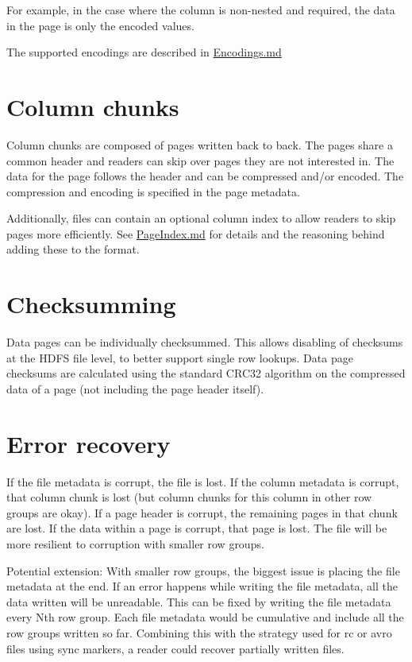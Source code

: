\documentclass[a4paper,12pt,notitlepage,twoside,openright]{article}
\begin{document}
For example, in the case where the column is non-nested and required,
the data in the page is only the encoded values.

The supported encodings are described in
\href{https://github.com/apache/parquet-format/blob/master/Encodings.md}{Encodings.md}

\hypertarget{column-chunks}{%
\section{Column chunks}\label{column-chunks}}

Column chunks are composed of pages written back to back. The pages
share a common header and readers can skip over pages they are not
interested in. The data for the page follows the header and can be
compressed and/or encoded. The compression and encoding is specified in
the page metadata.

Additionally, files can contain an optional column index to allow
readers to skip pages more efficiently. See \url{PageIndex.md} for
details and the reasoning behind adding these to the format.

\hypertarget{checksumming}{%
\section{Checksumming}\label{checksumming}}

Data pages can be individually checksummed. This allows disabling of
checksums at the HDFS file level, to better support single row lookups.
Data page checksums are calculated using the standard CRC32 algorithm on
the compressed data of a page (not including the page header itself).

\hypertarget{error-recovery}{%
\section{Error recovery}\label{error-recovery}}

If the file metadata is corrupt, the file is lost. If the column
metadata is corrupt, that column chunk is lost (but column chunks for
this column in other row groups are okay). If a page header is corrupt,
the remaining pages in that chunk are lost. If the data within a page is
corrupt, that page is lost. The file will be more resilient to
corruption with smaller row groups.

Potential extension: With smaller row groups, the biggest issue is
placing the file metadata at the end. If an error happens while writing
the file metadata, all the data written will be unreadable. This can be
fixed by writing the file metadata every Nth row group. Each file
metadata would be cumulative and include all the row groups written so
far. Combining this with the strategy used for rc or avro files using
sync markers, a reader could recover partially written files.
\end{document}
